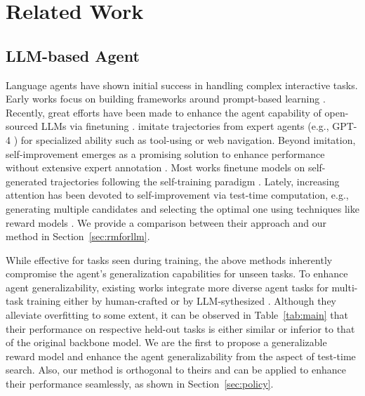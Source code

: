 \section{Related Work}
\subsection{LLM-based Agent}
Language agents have shown initial success in handling complex interactive tasks.
Early works focus on building frameworks around prompt-based learning \cite{yao2022react, shinn2024reflexion}.
Recently, great efforts have been made to enhance the agent capability of open-sourced LLMs via finetuning \cite{chen2023fireact, yin2024agent}.
\citet{qin2023toolllm, deng2024mind2web} imitate trajectories from expert agents (e.g., GPT-4 \cite{achiam2023gpt}) for specialized ability such as tool-using or web navigation.
Beyond imitation, self-improvement emerges as a promising solution to enhance performance without extensive expert annotation \cite{huang-etal-2023-large}. 
Most works finetune models on self-generated trajectories following the self-training paradigm \cite{wang2024learning, chen2024self, song2024trial, xiong2024watch}.
Lately, increasing attention has been devoted to self-improvement via test-time computation, e.g., generating multiple candidates and selecting the optimal one using techniques like reward models \cite{wang2024q, zhai2024enhancingdecisionmakingllmagents, lin2025qlassboostinglanguageagent}.
We provide a comparison between their approach and our method in Section~\ref{sec:rmforllm}.

While effective for tasks seen during training, the above methods inherently compromise the agent's generalization capabilities for unseen tasks.
To enhance agent generalizability, existing works integrate more diverse agent tasks for multi-task training either by human-crafted \cite{zeng2023agenttuning, chen2024agent, xi2024agentgym, zhang2024agentohana} or by LLM-sythesized \cite{hu2024agentgen, fu2025agentrefineenhancingagentgeneralization}.
Although they alleviate overfitting to some extent, it can be observed in Table~\ref{tab:main} that their performance on respective held-out tasks is either similar or inferior to that of the original backbone model.
We are the first to propose a generalizable reward model and enhance the agent generalizability from the aspect of test-time search.
Also, our method is orthogonal to theirs and can be applied to enhance their performance seamlessly, as shown in Section~\ref{sec:policy}.

